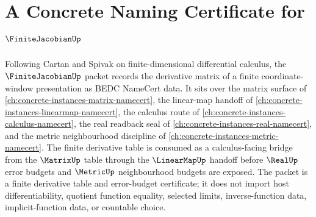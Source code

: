 \chapter{A Concrete Naming Certificate for $\FiniteJacobianUp$}
\label{ch:concrete-instances-finite-jacobian-namecert}

Following Cartan and Spivak on finite-dimensional differential calculus, the $\FiniteJacobianUp$ packet records the derivative matrix of a finite coordinate-window presentation as BEDC NameCert data. It sits over the matrix surface of \autoref{ch:concrete-instances-matrix-namecert}, the linear-map handoff of \autoref{ch:concrete-instances-linearmap-namecert}, the calculus route of \autoref{ch:concrete-instances-calculus-namecert}, the real readback seal of \autoref{ch:concrete-instances-real-namecert}, and the metric neighbourhood discipline of \autoref{ch:concrete-instances-metric-namecert}. The finite derivative table is consumed as a calculus-facing bridge from the $\MatrixUp$ table through the $\LinearMapUp$ handoff before $\RealUp$ error budgets and $\MetricUp$ neighbourhood budgets are exposed. The packet is a finite derivative table and error-budget certificate; it does not import host differentiability, quotient function equality, selected limits, inverse-function data, implicit-function data, or countable choice.

